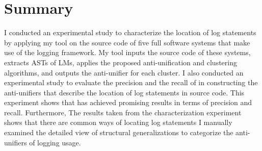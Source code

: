 

\section{Summary}
I conducted an experimental study to characterize the location of log statements by applying my tool on the source code of five full software systems that make use of the  logging framework. My tool inputs the source code of these systems, extracts ASTs of LMs, applies the proposed anti-unification and clustering algorithms, and outputs the anti-unifier for each cluster. I also conducted an experimental study to evaluate the precision and the recall of  in constructing the anti-unifiers that describe the location of log statements in source code. This experiment shows that  has achieved promising results in terms of precision and recall. Furthermore, The results taken from the characterization experiment shows that there are common ways of locating log statements I manually examined the detailed view of structural generalizations to categorize the anti-unifiers of logging usage.




